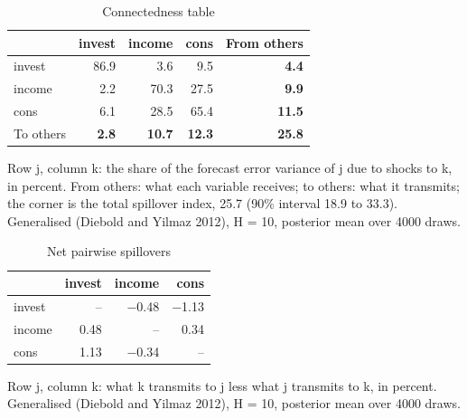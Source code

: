 \begin{table}[htbp]
  \centering
  \caption{Connectedness table}
  \label{tab:connectedness-table}
  \begin{tabular}{lrrrr}
    \toprule
     & invest & income & cons & From others \\
    \midrule
    invest & 86.9 & 3.6 & 9.5 & \textbf{4.4} \\
    income & 2.2 & 70.3 & 27.5 & \textbf{9.9} \\
    cons & 6.1 & 28.5 & 65.4 & \textbf{11.5} \\
    \midrule
    To others & \textbf{2.8} & \textbf{10.7} & \textbf{12.3} & \textbf{25.8} \\
    \bottomrule
  \end{tabular}
  \par\medskip\footnotesize Row j, column k: the share of the forecast error variance of j due to shocks to k, in percent. From others: what each variable receives; to others: what it transmits; the corner is the total spillover index, 25.7 (90\% interval 18.9 to 33.3). Generalised (Diebold and Yilmaz 2012), H = 10, posterior mean over 4000 draws.
\end{table}

\begin{table}[htbp]
  \centering
  \caption{Net pairwise spillovers}
  \label{tab:net-pairwise-spillovers}
  \begin{tabular}{lrrr}
    \toprule
     & invest & income & cons \\
    \midrule
    invest & -- & \ensuremath{-}0.48 & \ensuremath{-}1.13 \\
    income & 0.48 & -- & 0.34 \\
    cons & 1.13 & \ensuremath{-}0.34 & -- \\
    \bottomrule
  \end{tabular}
  \par\medskip\footnotesize Row j, column k: what k transmits to j less what j transmits to k, in percent. Generalised (Diebold and Yilmaz 2012), H = 10, posterior mean over 4000 draws.
\end{table}

